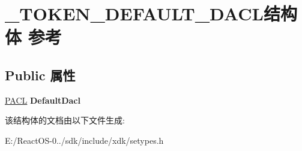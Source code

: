 \hypertarget{struct___t_o_k_e_n___d_e_f_a_u_l_t___d_a_c_l}{}\section{\+\_\+\+T\+O\+K\+E\+N\+\_\+\+D\+E\+F\+A\+U\+L\+T\+\_\+\+D\+A\+C\+L结构体 参考}
\label{struct___t_o_k_e_n___d_e_f_a_u_l_t___d_a_c_l}
\subsection*{Public 属性}
\begin{DoxyCompactItemize}
\item 
\mbox{\label{struct___t_o_k_e_n___d_e_f_a_u_l_t___d_a_c_l_a5f82dc1ef1d4ce41562a8fa9ef36741e}} 
\hyperlink{struct___a_c_l}{P\+A\+CL} {\bfseries Default\+Dacl}
\end{DoxyCompactItemize}


该结构体的文档由以下文件生成\+:\begin{DoxyCompactItemize}
\item 
E\+:/\+React\+O\+S-\/0../sdk/include/xdk/setypes.\+h\end{DoxyCompactItemize}
